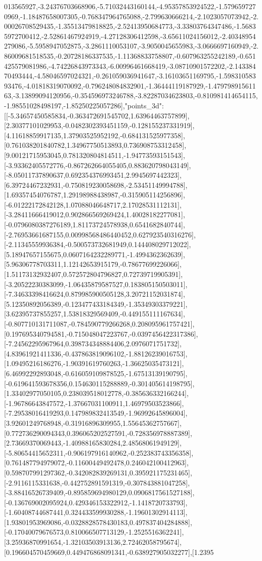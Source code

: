 \documentclass{article}
\begin{document}
013565927,-3.24376703668906,-5.71032443160144,-4.95357853924522,-1.5796597270969,-1.18487658007305,-0.768347964765088,-2.799630666214,-2.1023057073942,-2.00026708529435,-1.35513479818825,-2.52413950684773,-3.33803764347486,-1.56835972700412,-2.52861467924919,-4.27128306412598,-3.65611024156012,-2.40348954279086,-5.5958947052875,-3.2861110053107,-3.9050045655983,-3.0666697160949,-2.86009681518535,-0.20728186337535,-1.11368833758807,-0.607963255242189,-0.651425579081986,-4.74226843973343,-6.00996461668419,-3.08710901572202,-2.14338470493444,-4.58046597024321,-0.261059036941647,-3.16103651169795,-1.59831058393476,-4.01818319070092,-0.796248084832901,-1.36444119187929,-1.47979891561163,-3.13899094120956,-0.354596973246788,-3.82287034623803,-0.810981414654115,-1.98551028498197,-1.85250225057286],"points_3d":[[-5.34657450585834,-0.363472691545702,1.63964463757899],[2.30377101029953,-0.0482302393451159,-0.128155237331919],[4.11618859917135,1.37903525952192,-0.684131525977358],[0.761038201840782,1.34967750513893,0.736908753312458],[9.00121715953045,0.781320804814511,-1.94773593151543],[-3.93362405572776,-0.867262664055405,0.883620798043149],[-8.05011737890637,0.692354376993451,2.9945697442323],[6.39724467232931,-0.750819230058698,-2.53451149994788],[1.69357454076787,1.29198988438987,-0.315905114256896],[-6.01222172842128,1.07088046648717,2.17028531112131],[-3.28411666419012,0.902866569269424,1.40028182277081],[-0.0796080387276189,1.81173724578938,0.6541682840744],[-2.76953661687155,0.00998568486440452,0.627923540316276],[-2.11345559936384,-0.500573732681949,0.144408029712022],[5.18947657155675,0.0607164232289771,-1.4994362362639],[5.96306778703311,1.12142653915179,-0.78677699226066],[1.51173132932407,0.572572804796827,0.72739719905391],[-3.20522230383099,-1.06435879587527,0.183805150503011],[-7.34633398416624,0.879985900505128,3.20721152031874],[5.12350892056389,-0.123477433184349,-1.35349303379221],[3.62395737855257,1.53818329569409,-0.449155111167634],[-0.807710131711087,-0.784590779266268,0.208095961757421],[0.197695340794581,-0.715048047223767,-0.0397456422317386],[-7.24562295967964,0.398734348884406,2.0976071751732],[4.83961921411336,-0.437863819096102,-1.88126239016753],[1.09495216186276,-1.90391619760263,-1.36625035473121],[6.46992292893048,-0.616059109878525,-1.67513139190795],[-0.619641593678356,0.154630115288889,-0.301405614198795],[1.33402977050105,0.238039518012778,-0.385636332166244],[-1.96786643847572,-1.37667031100911,1.46979503523866],[-7.29538016419293,0.147989832413549,-1.96992645896004],[3.92601249768948,-0.31916896309955,1.55645362757667],[0.772736290094343,0.396065202527591,-0.728356978887389],[2.73669370069443,-1.40988165830284,2.48568061949129],[-5.80654415652311,-0.906197916140962,-0.252383743356358],[0.761487794979072,-0.11600449492478,0.246042100412963],[0.598707991297362,-0.342082839269131,0.395921175231465],[-2.9116115331638,-0.442752891591319,-0.307843881047258],[-3.88416526739409,-0.895859694980129,0.0906817561527188],[-0.136769002095924,0.429346153322912,-1.1418720733793],[-1.60408744687441,0.324433599930288,-1.19601302914113],[1.93801953969086,-0.0328828578430183,0.497837404284888],[-0.17040079676573,0.810066507713129,-1.2525516362241],[3.25936870991654,-1.32103503913136,2.72462058795674],[0.196604570459669,0.449476868091341,-0.638927905032277],[1.2395
\end{document}
